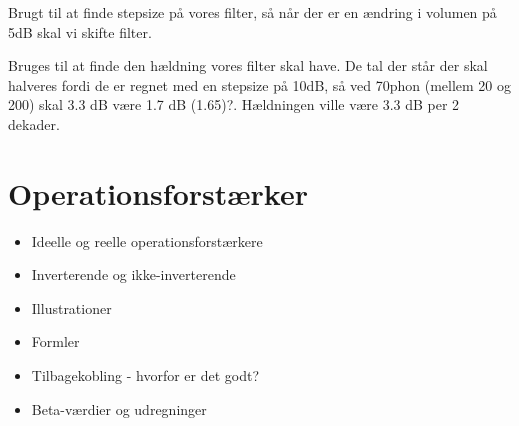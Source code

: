 \begin{table}[H]
\centering
{}
\caption{Hældningen mellem 20Hz og 630Hz for hver phon-kurve, udregnet ved differencen derimellem.}
\label{tab:HaeldningFra20til630}
\end{table}
\noindent
%
Brugt til at finde stepsize på vores filter, så når der er en ændring i volumen på 5dB skal vi skifte filter. 

\begin{table}[H]
\centering
{}
\caption{Hældningen per dekade, udregnet ved differencen derimellem.}
\label{tab:HaeldningFra20til630}
\end{table}
\noindent
%
Bruges til at finde den hældning vores filter skal have. De tal der står der skal halveres fordi de er regnet med en stepsize på 10dB, så ved 70phon (mellem 20 og 200) skal 3.3 dB være 1.7 dB (1.65)?. Hældningen ville være 3.3 dB per 2 dekader. 

\section{Operationsforstærker}
\label{OpAmp}
%
\begin{itemize}
  \item Ideelle og reelle operationsforstærkere
  \item Inverterende og ikke-inverterende 
  \item Illustrationer
  \item Formler
  \item Tilbagekobling - hvorfor er det godt? 
  \item Beta-værdier og udregninger 
\end{itemize}

